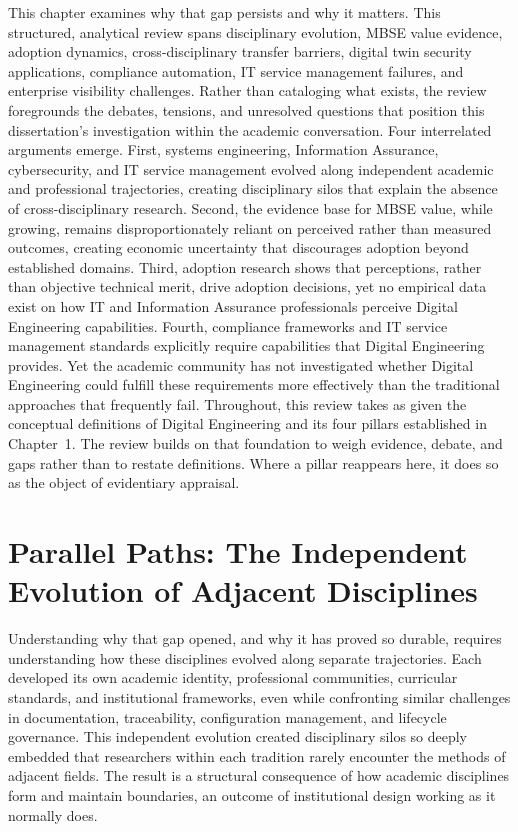 This chapter examines why that gap persists and why it matters. This structured, analytical review spans disciplinary evolution, MBSE value evidence, adoption dynamics, cross-disciplinary transfer barriers, digital twin security applications, compliance automation, IT service management failures, and enterprise visibility challenges. Rather than cataloging what exists, the review foregrounds the debates, tensions, and unresolved questions that position this dissertation's investigation within the academic conversation. Four interrelated arguments emerge. First, systems engineering, Information Assurance, cybersecurity, and IT service management evolved along independent academic and professional trajectories, creating disciplinary silos that explain the absence of cross-disciplinary research. Second, the evidence base for MBSE value, while growing, remains disproportionately reliant on perceived rather than measured outcomes, creating economic uncertainty that discourages adoption beyond established domains. Third, adoption research shows that perceptions, rather than objective technical merit, drive adoption decisions, yet no empirical data exist on how IT and Information Assurance professionals perceive Digital Engineering capabilities. Fourth, compliance frameworks and IT service management standards explicitly require capabilities that Digital Engineering provides. Yet the academic community has not investigated whether Digital Engineering could fulfill these requirements more effectively than the traditional approaches that frequently fail. Throughout, this review takes as given the conceptual definitions of Digital Engineering and its four pillars established in Chapter~1. The review builds on that foundation to weigh evidence, debate, and gaps rather than to restate definitions. Where a pillar reappears here, it does so as the object of evidentiary appraisal.

\section{Parallel Paths: The Independent Evolution of Adjacent Disciplines}

Understanding why that gap opened, and why it has proved so durable, requires understanding how these disciplines evolved along separate trajectories. Each developed its own academic identity, professional communities, curricular standards, and institutional frameworks, even while confronting similar challenges in documentation, traceability, configuration management, and lifecycle governance. This independent evolution created disciplinary silos so deeply embedded that researchers within each tradition rarely encounter the methods of adjacent fields. The result is a structural consequence of how academic disciplines form and maintain boundaries, an outcome of institutional design working as it normally does.

